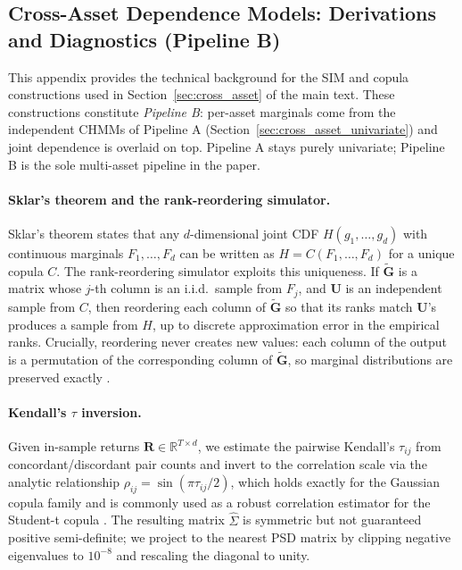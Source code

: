 \subsection{Cross-Asset Dependence Models: Derivations and Diagnostics (Pipeline B)}
\label{sec:cross_asset_supp}

This appendix provides the technical background for the SIM and copula constructions used in Section~\ref{sec:cross_asset} of the main text. These constructions constitute \emph{Pipeline B}: per-asset marginals come from the independent CHMMs of Pipeline A (Section~\ref{sec:cross_asset_univariate}) and joint dependence is overlaid on top. Pipeline A stays purely univariate; Pipeline B is the sole multi-asset pipeline in the paper.

\paragraph{Sklar's theorem and the rank-reordering simulator.}
Sklar's theorem \cite{sklar1959fonctions, nelsen2006introduction} states that any $d$-dimensional joint CDF $H(g_1, \dots, g_d)$ with continuous marginals $F_1, \dots, F_d$ can be written as $H = C(F_1, \dots, F_d)$ for a unique copula $C$.
The rank-reordering simulator exploits this uniqueness.
If $\tilde{\mathbf{G}}$ is a matrix whose $j$-th column is an i.i.d.\ sample from $F_j$, and $\mathbf{U}$ is an independent sample from $C$, then reordering each column of $\tilde{\mathbf{G}}$ so that its ranks match $\mathbf{U}$'s produces a sample from $H$, up to discrete approximation error in the empirical ranks.
Crucially, reordering never creates new values: each column of the output is a permutation of the corresponding column of $\tilde{\mathbf{G}}$, so marginal distributions are preserved exactly \cite{iman1982distribution}.

\paragraph{Kendall's $\tau$ inversion.}
Given in-sample returns $\mathbf{R} \in \mathbb{R}^{T \times d}$, we estimate the pairwise Kendall's $\tau_{ij}$ from concordant/discordant pair counts and invert to the correlation scale via the analytic relationship $\rho_{ij} = \sin(\pi \tau_{ij} / 2)$, which holds exactly for the Gaussian copula family and is commonly used as a robust correlation estimator for the Student-t copula \cite{embrechts2002correlation, mcneil2015quantitative}.
The resulting matrix $\hat{\Sigma}$ is symmetric but not guaranteed positive semi-definite; we project to the nearest PSD matrix by clipping negative eigenvalues to $10^{-8}$ and rescaling the diagonal to unity.

